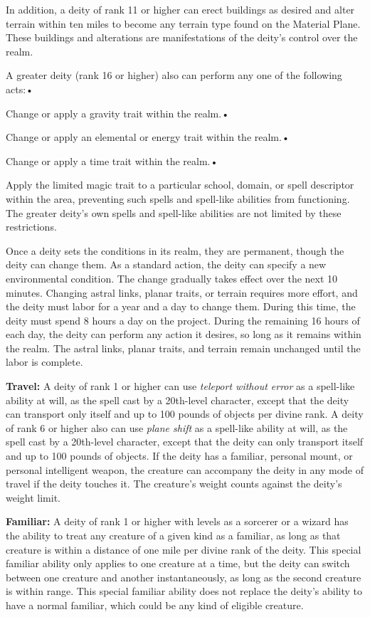 \documentclass{article}
\begin{document}
In addition, a deity of rank 11 or higher can erect buildings as desired and alter 
terrain within ten miles to become any terrain type found on the Material Plane. 
These buildings and alterations are manifestations of the deity's control over 
the realm.

A greater deity (rank 16 or higher) also can perform any one of the following acts:• 

\parindent=3pt
Change or apply a gravity trait within the realm.• 

Change or apply an elemental or energy trait within the realm.• 

\parindent=7pt
Change or apply a time trait within the realm.• 

\parindent=3pt
Apply the limited magic trait to a particular school, domain, or spell descriptor 
within the area, preventing such spells and spell-like abilities from functioning. 
The greater deity's own spells and spell-like abilities are not limited by these 
restrictions.

\parindent=0pt
Once a deity sets the conditions in its realm, they are permanent, though the deity 
can change them. As a standard action, the deity can specify a new environmental 
condition. The change gradually takes effect over the next 10 minutes. Changing 
astral links, planar traits, or terrain requires more effort, and the deity must 
labor for a year and a day to change them. During this time, the deity must spend 
8 hours a day on the project. During the remaining 16 hours of each day, the deity 
can perform any action it desires, so long as it remains within the realm. The 
astral links, planar traits, and terrain remain unchanged until the labor is complete. 

\vspace{12pt}
\textbf{Travel:} A deity of rank 1 or higher can use \textit{teleport without error 
}as a spell-like ability at will, as the spell cast by a 20th-level character, 
except that the deity can transport only itself and up to 100 pounds of objects 
per divine rank. A deity of rank 6 or higher also can use \textit{plane shift }as 
a spell-like ability at will, as the spell cast by a 20th-level character, except 
that the deity can only transport itself and up to 100 pounds of objects. If the 
deity has a familiar, personal mount, or personal intelligent weapon, the creature 
can accompany the deity in any mode of travel if the deity touches it. The creature's 
weight counts against the deity's weight limit.

\vspace{12pt}
\textbf{Familiar:} A deity of rank 1 or higher with levels as a sorcerer or a wizard 
has the ability to treat any creature of a given kind as a familiar, as long as 
that creature is within a distance of one mile per divine rank of the deity. This 
special familiar ability only applies to one creature at a time, but the deity 
can switch between one creature and another instantaneously, as long as the second 
creature is within range. This special familiar ability does not replace the deity's 
ability to have a normal familiar, which could be any kind of eligible creature.

\newpage
\end{document}
